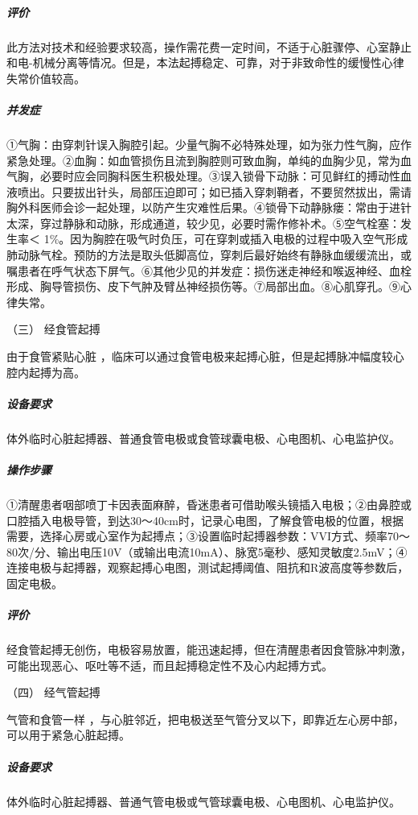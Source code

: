 \subparagraph{评价}

此方法对技术和经验要求较高，操作需花费一定时间，不适于心脏骤停、心室静止和电-机械分离等情况。但是，本法起搏稳定、可靠，对于非致命性的缓慢性心律失常价值较高。

\subparagraph{并发症}

①气胸：由穿刺针误入胸腔引起。少量气胸不必特殊处理，如为张力性气胸，应作紧急处理。②血胸：如血管损伤且流到胸腔则可致血胸，单纯的血胸少见，常为血气胸，必要时应会同胸科医生积极处理。③误入锁骨下动脉：可见鲜红的搏动性血液喷出。只要拔出针头，局部压迫即可；如已插入穿刺鞘者，不要贸然拔出，需请胸外科医师会诊一起处理，以防产生灾难性后果。④锁骨下动静脉瘘：常由于进针太深，穿过静脉和动脉，形成通道，较少见，必要时需作修补术。⑤空气栓塞：发生率＜
1\%。因为胸腔在吸气时负压，可在穿刺或插入电极的过程中吸入空气形成肺动脉气栓。预防的方法是取头低脚高位，穿刺后最好始终有静脉血缓缓流出，或嘱患者在呼气状态下屏气。⑥其他少见的并发症：损伤迷走神经和喉返神经、血栓形成、胸导管损伤、皮下气肿及臂丛神经损伤等。⑦局部出血。⑧心肌穿孔。⑨心律失常。

\hypertarget{text00375.htmlux5cux23CHP16-5-3-3}{}
（三） 经食管起搏

由于食管紧贴心脏
，临床可以通过食管电极来起搏心脏，但是起搏脉冲幅度较心腔内起搏为高。

\subparagraph{设备要求}

体外临时心脏起搏器、普通食管电极或食管球囊电极、心电图机、心电监护仪。

\subparagraph{操作步骤}

①清醒患者咽部喷丁卡因表面麻醉，昏迷患者可借助喉头镜插入电极；②由鼻腔或口腔插入电极导管，到达30～40cm时，记录心电图，了解食管电极的位置，根据需要，选择心房或心室作为起搏点；③设置临时起搏器参数：VVI方式、频率70～80次/分、输出电压10V（或输出电流10mA）、脉宽5毫秒、感知灵敏度2.5mV；④连接电极与起搏器，观察起搏心电图，测试起搏阈值、阻抗和R波高度等参数后，固定电极。

\subparagraph{评价}

经食管起搏无创伤，电极容易放置，能迅速起搏，但在清醒患者因食管脉冲刺激，可能出现恶心、呕吐等不适，而且起搏稳定性不及心内起搏方式。

\hypertarget{text00375.htmlux5cux23CHP16-5-3-4}{}
（四） 经气管起搏

气管和食管一样
，与心脏邻近，把电极送至气管分叉以下，即靠近左心房中部，可以用于紧急心脏起搏。

\subparagraph{设备要求}

体外临时心脏起搏器、普通气管电极或气管球囊电极、心电图机、心电监护仪。

